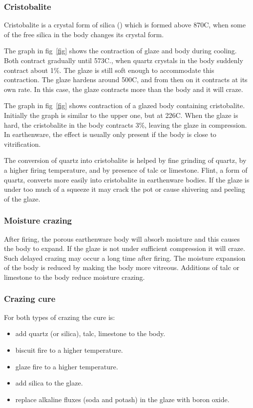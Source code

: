 \subsubsection{Cristobalite}
Cristobalite is a crystal form of silica () which is formed above 
870\degree C, 
when some of the free silica in the body changes its crystal form.

The graph in fig~\ref{fig} shows the contraction of glaze and body during 
cooling. Both contract gradually until 573\degree C., when quartz crystals in 
the body suddenly contract about 1\%. The glaze is still soft enough to 
accommodate this contraction. The glaze hardens around 500\degree C, and from 
then on it contracts at its own rate. In this case, the glaze contracts more 
than the body and it will craze.

The graph in fig~\ref{fig} shows contraction of a glazed body containing 
cristobalite. Initially the graph is similar to the upper one, but at 
226\degree C. When the glaze is hard, the cristobalite in the body contracts 
3\%, leaving the glaze in compression. In earthenware, the effect is usually 
only present if the body is close to vitrification.

The conversion of quartz into cristobalite is helped by fine grinding of 
quartz, by a higher firing temperature, and by presence of talc or limestone. 
Flint, a form of quartz, converts more easily into cristobalite in earthenware 
bodies. If the glaze is under too much of a squeeze it may crack the pot or 
cause shivering and peeling of the glaze.
\subsubsection{Moisture crazing}
After firing, the porous earthenware body will absorb moisture and this causes 
the body to expand. If the glaze is not under sufficient compression it will 
craze. Such delayed crazing may occur a long time after firing. The moisture 
expansion of the body is reduced by making the body more vitreous. Additions of 
talc or limestone to the body reduce moisture crazing.
\subsubsection{Crazing cure}
For both types of crazing the cure is:
\begin{itemize}
\item add quartz (or silica), talc, limestone to the body.
\item biscuit fire to a higher temperature.
\item glaze fire to a higher temperature.
\item add silica to the glaze.
\item replace alkaline fluxes (soda and potash) in the glaze with boron oxide.
\end{itemize}
